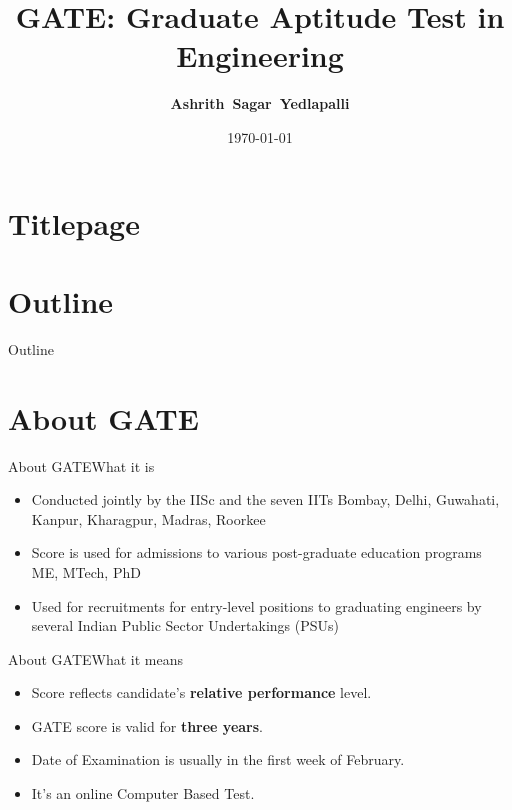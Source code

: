 \documentclass[handout]{beamer}
\title[GATE]{\textbf{GATE}: Graduate Aptitude Test in Engineering}
\author[Ashrith]{\textbf{Ashrith~Sagar~Yedlapalli}}
\institute[MIT]{Manipal Institute of Technology, Manipal}
\date{\today}
\begin{document}
\section*{Titlepage}
\begin{frame}
    \titlepage
\end{frame}

\section*{Outline}
\begin{frame}{Outline}
    \tableofcontents
\end{frame}

\section{About GATE}
\begin{frame}{About GATE}{What it is}
    \begin{itemize}
        \item Conducted jointly by the IISc and the seven IITs \textbraceleft Bombay, Delhi, Guwahati, Kanpur, Kharagpur, Madras, Roorkee\textbraceright
        \item Score is used for admissions to various post-graduate education programs \textbraceleft ME, MTech, PhD\textbraceright
        \item Used for recruitments for entry-level positions to graduating engineers by several Indian Public Sector Undertakings (PSUs)
    \end{itemize}
\end{frame}

\begin{frame}{About GATE}{What it means}
    \begin{itemize}
        \item Score reflects candidate's \textbf{relative performance} level.
        \item GATE score is valid for \textbf{three years}.
        \item Date of Examination is usually in the first week of February.
        \item It's an online Computer Based Test.
    \end{itemize}
\end{frame}
\end{document}
